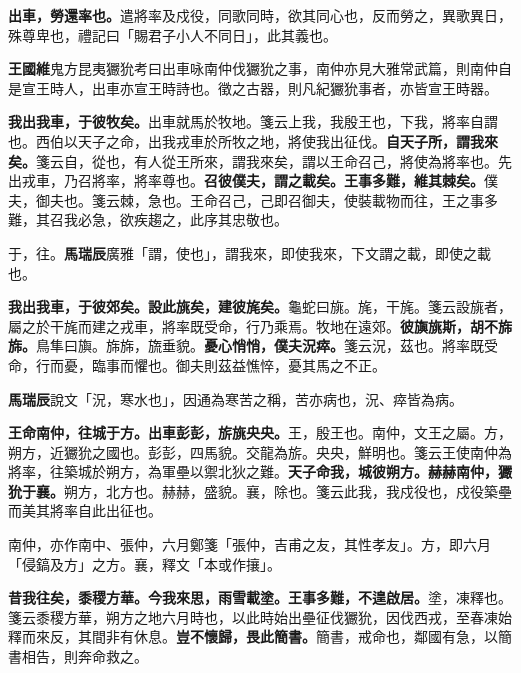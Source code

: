 
\textbf{出車，勞還率也。}{\footnotesize 遣將率及戍役，同歌同時，欲其同心也，反而勞之，異歌異日，殊尊卑也，禮記曰「賜君子小人不同日」，此其義也。}

\begin{quoting}\textbf{王國維}鬼方昆夷玁狁考曰出車咏南仲伐玁狁之事，南仲亦見大雅常武篇，則南仲自是宣王時人，出車亦宣王時詩也。徵之古器，則凡紀玁狁事者，亦皆宣王時器。\end{quoting}

\textbf{我出我車，于彼牧矣。}{\footnotesize 出車就馬於牧地。箋云上我，我殷王也，下我，將率自謂也。西伯以天子之命，出我戎車於所牧之地，將使我出征伐。}\textbf{自天子所，謂我來矣。}{\footnotesize 箋云自，從也，有人從王所來，謂我來矣，謂以王命召己，將使為將率也。先出戎車，乃召將率，將率尊也。}\textbf{召彼僕夫，謂之載矣。王事多難，維其棘矣。}{\footnotesize 僕夫，御夫也。箋云棘，急也。王命召己，己即召御夫，使裝載物而往，王之事多難，其召我必急，欲疾趨之，此序其忠敬也。}

\begin{quoting}于，往。\textbf{馬瑞辰}廣雅「謂，使也」，謂我來，即使我來，下文謂之載，即使之載也。\end{quoting}

\textbf{我出我車，于彼郊矣。設此旐矣，建彼旄矣。}{\footnotesize 龜蛇曰旐。旄，干旄。箋云設旐者，屬之於干旄而建之戎車，將率既受命，行乃乘焉。牧地在遠郊。}\textbf{彼旟旐斯，胡不旆旆。}{\footnotesize 鳥隼曰旟。旆旆，旒垂貌。}\textbf{憂心悄悄，僕夫況瘁。}{\footnotesize 箋云況，茲也。將率既受命，行而憂，臨事而懼也。御夫則茲益憔悴，憂其馬之不正。}

\begin{quoting}\textbf{馬瑞辰}說文「況，寒水也」，因通為寒苦之稱，苦亦病也，況、瘁皆為病。\end{quoting}

\textbf{王命南仲，往城于方。出車彭彭，旂旐央央。}{\footnotesize 王，殷王也。南仲，文王之屬。方，朔方，近玁狁之國也。彭彭，四馬貌。交龍為旂。央央，鮮明也。箋云王使南仲為將率，往築城於朔方，為軍壘以禦北狄之難。}\textbf{天子命我，城彼朔方。赫赫南仲，玁狁于襄。}{\footnotesize 朔方，北方也。赫赫，盛貌。襄，除也。箋云此我，我戍役也，戍役築壘而美其將率自此出征也。}

\begin{quoting}南仲，亦作南中、張仲，六月鄭箋「張仲，吉甫之友，其性孝友」。方，即六月「侵鎬及方」之方。襄，釋文「本或作攘」。\end{quoting}

\textbf{昔我往矣，黍稷方華。今我來思，雨雪載塗。王事多難，不遑啟居。}{\footnotesize 塗，凍釋也。箋云黍稷方華，朔方之地六月時也，以此時始出壘征伐玁狁，因伐西戎，至春凍始釋而來反，其間非有休息。}\textbf{豈不懷歸，畏此簡書。}{\footnotesize 簡書，戒命也，鄰國有急，以簡書相告，則奔命救之。}

